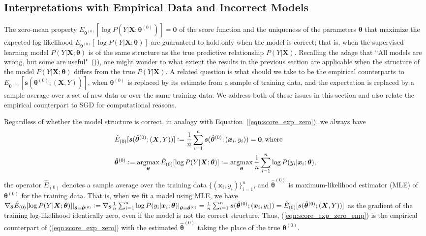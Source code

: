 \documentclass[twoside,11pt]{article}
\DeclareMathOperator*{\argmax}{argmax} %
\begin{document}
\subsection{Interpretations with Empirical Data and Incorrect Models}
\label{ss:sgd_score}
The zero-mean property $E_{\bm{\theta}^{(0)}}[\log{P(Y|\bm{X}; \bm{\theta}^{(0)})}] = \textbf{0}$ of the score function and the uniqueness of the parameters $\bm{\theta}$ that maximize the expected log-likelihood $E_{\bm{\theta}^{(0)}}[\log P(Y|\bm{X}; \bm{\theta})]$ are guaranteed to hold only when the model is correct; that is, when the supervised learning model $P(Y|\bm{X};\bm{\theta})$ is of the same structure as the true predictive relationship $P(Y|\bm{X})$. Recalling the adage that ``All models are wrong, but some are useful"~(\cite{box1976science})), one might wonder to what extent the results in the previous section are applicable when the structure of the model $P(Y|\bm{X};\bm{\theta})$ differs from the true $P(Y|\bm{X})$. A related question is what should we take to be the empirical counterparts to $E_{\bm{\theta}^{(0)}}[\bm{s}(\bm{\theta}^{(0)};(\bm{X},Y) )]$, when $\bm{\theta}^{(0)}$ is replaced by its estimate from a sample of training data, and the expectation is replaced by a sample average over a set of new data or over the same training data. We address both of these issues in this section and also relate the empirical counterpart to SGD for computational reasons. 

Regardless of whether the model structure is correct, in analogy with Equation~(\ref{eqn:score_exp_zero}), we always have
\begin{align}
\begin{aligned}
&\hat{E}_{(0)}[\bm{s}(\hat{\bm{\theta}}^{(0)};(\bm{X}, Y))] \vcentcolon=\frac{1}{n}\sum_{i=1}^{n}\bm{s}(\hat{\bm{\theta}}^{(0)};(\bm{x}_i, y_i))=\bm{0}, \text{where} \\
&\hat{\bm{\theta}}^{(0)} \vcentcolon =  \argmax_{\bm{\theta}}\hat{E}_{(0)}[\log{P(Y|\bm{X}; \bm{\theta})}] \vcentcolon= \argmax_{\bm{\theta}}\frac{1}{n}\sum_{i=1}^n \log{P(y_i|\bm{x}_i;\bm{\theta})},
\end{aligned}
\label{eqn:score_exp_zero_emp}
\end{align}   
the operator $\hat{E}_{(0)}$ denotes a sample average over the training data $\{(\bm{x}_i, y_i)\}_{i=1}^n$, and $\hat{\bm{\theta}}^{(0)}$ is maximum-likelihood estimator (MLE) of $\bm{\theta}^{(0)}$ for the training data. That is, when we fit a model using MLE, we have $\nabla_{\bm{\theta}}\hat{E}_{(0)}[\log{P(Y|\bm{X}; {\bm{\theta}})}]|_{\bm{\theta}=\hat{\bm{\theta}}^{(0)}} \vcentcolon=\nabla_{\bm{\theta}}\frac{1}{n}\sum_{i=1}^n \log{P(y_i|\bm{x}_i;{\bm{\theta}})|_{\bm{\theta}=\hat{\bm{\theta}}^{(0)}}}\\=\frac{1}{n}\sum_{i=1}^n\bm{s}(\hat{\bm{\theta}}^{(0)};(\bm{x}_i, y_i)) = \hat{E}_{(0)}[\bm{s}(\hat{\bm{\theta}}^{(0)};(\bm{X}, Y))]$ as the gradient of the training log-likelihood identically zero, even if the model is not the correct structure. Thus, (\ref{eqn:score_exp_zero_emp}) is the empirical counterpart of (\ref{eqn:score_exp_zero}) with the estimated $\hat{\bm{\theta}}^{(0)}$ taking the place of the true $\bm{\theta}^{(0)}$. 
\end{document}
